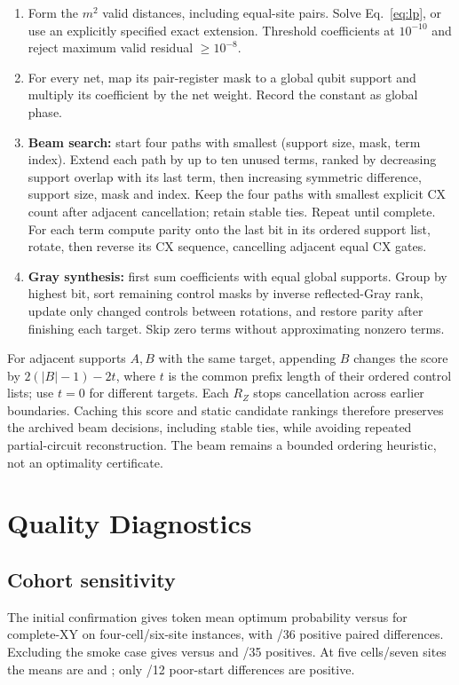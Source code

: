 \documentclass[manuscript,screen,review]{acmart}
\begin{document}
\begin{algorithm}[H]
\caption{Valid-domain completion and parity synthesis}
\label{alg:phase}
\begin{enumerate}
\item Form the $m^2$ valid distances, including equal-site pairs. Solve
Eq.~\eqref{eq:lp}, or use an explicitly specified exact extension. Threshold
coefficients at $10^{-10}$ and reject maximum valid residual $\ge10^{-8}$.
\item For every net, map its pair-register mask to a global qubit support and
multiply its coefficient by the net weight. Record the constant as global phase.
\item \textbf{Beam search:} start four paths with smallest
(support size, mask, term index). Extend each path by up to ten unused terms,
ranked by decreasing support overlap with its last term, then increasing
symmetric difference, support size, mask and index. Keep the four paths with
smallest explicit CX count after adjacent cancellation; retain stable ties.
Repeat until complete. For each term compute parity onto the last bit in its ordered support
list, rotate, then reverse its CX sequence, cancelling adjacent equal CX gates.
\item \textbf{Gray synthesis:} first sum coefficients with equal global supports.
Group by highest bit, sort remaining control masks by inverse reflected-Gray
rank, update only changed controls between rotations, and restore parity after
finishing each target. Skip zero terms without approximating nonzero terms.
\end{enumerate}
For adjacent supports $A,B$ with the same target, appending $B$ changes the
score by $2(|B|-1)-2t$, where $t$ is the common prefix length of their ordered
control lists; use $t=0$ for different targets. Each $R_Z$ stops cancellation
across earlier boundaries. Caching this score and static candidate rankings
therefore preserves the archived beam decisions, including stable ties, while
avoiding repeated partial-circuit reconstruction. The beam remains a bounded
ordering heuristic, not an optimality certificate.
\end{algorithm}



\section{Quality Diagnostics}
\label{sec:quality-diagnostics}
\subsection{Cohort sensitivity}
The initial confirmation gives token mean optimum probability \FourToken{} versus
\FourPenalty{} for complete-XY on four-cell/six-site instances, with \FourWins/36 positive paired
differences. Excluding the smoke case gives \UnseenFourToken{} versus
\UnseenFourPenalty{} and \UnseenFourWins/35 positives. At five cells/seven sites the means are
\FiveToken{} and \FivePenalty{}; only \FivePoorWins/12 poor-start differences
are positive. 
\end{document}
